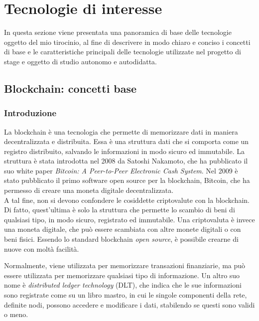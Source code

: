 \chapter{Tecnologie di interesse}\label{cap:tecnologie}

In questa sezione viene presentata una panoramica di base delle tecnologie oggetto del mio tirocinio,
al fine di descrivere in modo chiaro e conciso i concetti di base e le caratteristiche principali delle tecnologie
utilizzate nel progetto di stage e oggetto di studio autonomo e autodidatta.

\section{Blockchain: concetti base}\label{sec:tecnologie-blockchain}

\subsection{Introduzione}\label{sec:tecnologie-blockchain-introduzione}

La blockchain è una tecnologia che permette di memorizzare dati in maniera decentralizzata e distribuita.
Essa è una struttura dati che si comporta come un registro distribuito, salvando le informazioni in modo sicuro ed immutabile.
La struttura è stata introdotta nel 2008 da Satoshi Nakamoto, che ha pubblicato il suo white paper \textit{Bitcoin: A Peer-to-Peer Electronic Cash System}.
Nel 2009 è stato pubblicato il primo software open source per la blockchain, Bitcoin, che ha permesso di creare una moneta digitale decentralizzata. \\

A tal fine, non si devono confondere le cosiddette criptovalute con la blockchain. Di fatto, quest'ultima è solo la struttura che permette lo scambio di beni di qualsiasi tipo,
in modo sicuro, registrato ed immutabile. Una criptovaluta è invece una moneta digitale, che può essere scambiata con altre monete digitali o con beni fisici.
Essendo lo standard blockchain \textit{open source}, è possibile crearne di nuove con moltà facilità.

Normalmente, viene utilizzata per memorizzare transazioni finanziarie, ma può essere utilizzata per memorizzare qualsiasi tipo di informazione.
Un altro suo nome è \textit{distributed ledger technology} (DLT), che indica che le sue informazioni sono registrate come su un libro mastro, in cui le singole componenti della rete,
definite nodi, possono accedere e modificare i dati, stabilendo se questi sono validi o meno. 

